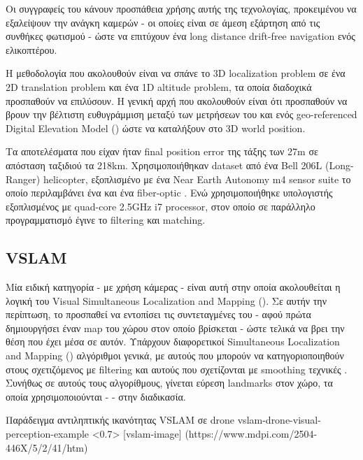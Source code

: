 Οι συγγραφείς του \cite{lidar-usage-example} κάνουν προσπάθεια χρήσης αυτής της τεχνολογίας, προκειμένου να εξαλείψουν την ανάγκη καμερών - οι οποίες είναι σε άμεση εξάρτηση από τις συνθήκες φωτισμού - ώστε να επιτύχουν ένα long distance drift-free navigation ενός ελικοπτέρου.

Η μεθοδολογία που ακολουθούν είναι να σπάνε το 3D localization problem σε ένα 2D translation problem και ένα 1D altitude problem, τα οποία διαδοχικά προσπαθούν να επιλύσουν. Η γενική αρχή που ακολουθούν είναι ότι προσπαθούν να βρουν την βέλτιστη ευθυγράμμιση μεταξύ των μετρήσεων του  και ενός geo-referenced Digital Elevation Model () ώστε να καταλήξουν στο 3D world position.

Τα αποτελέσματα που είχαν ήταν final position error της τάξης των 27m σε απόσταση ταξιδιού τα 218km. Χρησιμοποιήθηκαν dataset από ένα Bell 206L (Long-Ranger) helicopter, εξοπλισμένο με ένα Near Earth Autonomy m4 sensor suite το οποίο περιλαμβάνει ένα   και ένα fiber-optic . Ενώ χρησιμοποιήθηκε υπο\-λο\-γι\-στής εξοπλισμένος με quad-core 2.5GHz i7 processor, στον οποίο σε παράλληλο προγραμματισμό έγινε το filtering και matching.

\subsection{VSLAM}	\label{sec:related-vslam}
Μία ειδική κατηγορία - με χρήση κάμερας - είναι αυτή στην οποία ακολουθείται η λογική του Visual Simultaneous Localization and Mapping (). Σε αυτήν την περίπτωση, το  προσπαθεί να εντοπίσει τις συντεταγμένες του - αφού πρώτα δημιουργήσει έναν map του χώρου στον οποίο βρίσκεται - ώστε τελικά να βρει την θέση που έχει μέσα σε αυτόν. 
Υπάρχουν διαφορετικοί Simultaneous Lo\-ca\-li\-za\-tion and Mapping () αλγόριθμοι γενικά, με αυτούς που μπορούν να κατηγοριοποιηθούν στους σχετιζόμενος με filtering και αυτούς που σχετίζονται με smoothing τεχνικές \cite{related-slam-difs}. Συνήθως σε αυτούς τους αλγορίθμους, γίνεται εύρεση landmarks στον χώρο, τα οποία χρησιμοποιούνται -  - στην διαδικασία.

{Παράδειγμα αντιληπτικής ικανότητας VSLAM σε drone}%
{vslam-drone-visual-perception-example}%
<0.7>%
[vslam-image]%
(https://www.mdpi.com/2504-446X/5/2/41/htm)


